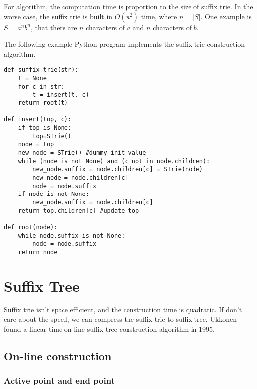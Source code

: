 \documentclass{article}
\begin{document}
For  algorithm, the computation time
is proportion to the size of suffix trie. In the worse case, the suffix trie is
built in $O(n^2)$ time, where $n = |S|$. One example is $S=a^nb^n$, that there are $n$
characters of $a$ and $n$ characters of $b$.

The following example Python program implements the suffix trie construction algorithm.

\lstset{language=Python}
\begin{lstlisting}
def suffix_trie(str):
    t = None
    for c in str:
        t = insert(t, c)
    return root(t)

def insert(top, c):
    if top is None:
        top=STrie()
    node = top
    new_node = STrie() #dummy init value
    while (node is not None) and (c not in node.children):
        new_node.suffix = node.children[c] = STrie(node)
        new_node = node.children[c]
        node = node.suffix
    if node is not None:
        new_node.suffix = node.children[c]
    return top.children[c] #update top

def root(node):
    while node.suffix is not None:
        node = node.suffix
    return node
\end{lstlisting}

\section{Suffix Tree}

Suffix trie isn't space efficient, and the construction time
is quadratic. If don't care about the speed, we can compress the
suffix trie to suffix tree\cite{trivial-stree-java}. Ukkonen
found a linear time on-line suffix tree construction algorithm
in 1995.

\subsection{On-line construction}

\subsubsection{Active point and end point}
\label{ap-and-ep}
\end{document}
